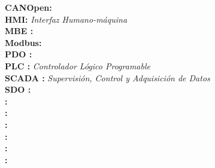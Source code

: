 \noindent
\textbf{CANOpen:} \textit{}\\
\textbf{HMI:} \textit{Interfaz Humano-máquina}\\
\textbf{MBE :} \textit{}\\
\textbf{Modbus:} \textit{}\\
\textbf{PDO :} \textit{}\\
\textbf{PLC :} \textit{Controlador Lógico Programable}\\
\textbf{SCADA :} \textit{Supervisión, Control y Adquisición de Datos}\\ %
\textbf{SDO :} \textit{}\\
\textbf{ :} \textit{}\\
\textbf{ :} \textit{}\\
\textbf{ :} \textit{}\\
\textbf{ :} \textit{}\\
\textbf{ :} \textit{}\\
\textbf{ :} \textit{}\\

\newpage